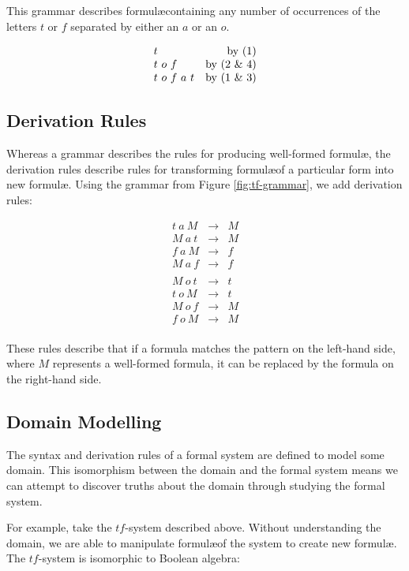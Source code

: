 This grammar describes formul\ae containing any number of occurrences of the letters $t$ or $f$ separated by either an $a$ or an $o$.

\[
\begin{array}{lr}
  t & \text{by (1)} \\
  t\ o\ f & \text{by (2 \& 4)} \\
  t\ o\ f\ a\ t & \text{by (1 \& 3)}
\end{array}
\]

\subsection{Derivation Rules}
Whereas a grammar describes the rules for producing well-formed formul\ae,
the derivation rules describe rules for transforming formul\ae of a particular form into new formul\ae. 
Using the grammar from Figure \ref{fig:tf-grammar}, we add derivation rules:

\[
\begin{array}{lcl}
  t\ a\ M &\to& M \\ 
  M\ a\ t &\to& M \\
  f\ a\ M &\to& f \\
  M\ a\ f &\to& f \\
  \\
  M\ o\ t &\to& t \\ 
  t\ o\ M &\to& t \\
  M\ o\ f &\to& M \\
  f\ o\ M &\to& M \\
\end{array}
\]

These rules describe that if a formula matches the pattern on the 
left-hand side, where $M$ represents a well-formed formula, it can be
replaced by the formula on the right-hand side.

\subsection{Domain Modelling}

The syntax and derivation rules of a formal system are defined to model 
some domain. This isomorphism between the domain and the formal system
means we can attempt to discover truths about the domain through studying
the formal system.

For example, take the $tf$-system described above. Without
understanding the domain, we are able to manipulate formul\ae of the
system to create new formul\ae. The $tf$-system is isomorphic to
Boolean algebra:

